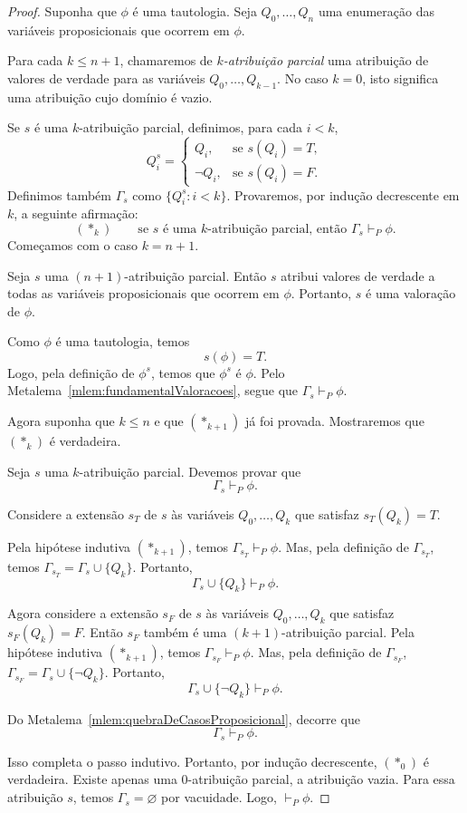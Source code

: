 \begin{proof}
    Suponha que $\phi$ é uma tautologia.
    Seja $Q_0,\dots,Q_n$
    uma enumeração das variáveis proposicionais que ocorrem em $\phi$.

    Para cada $k\leq n+1$, chamaremos de \emph{$k$-atribuição parcial} uma atribuição de valores de verdade para as variáveis $Q_0,\dots,Q_{k-1}$.
    No caso $k=0$, isto significa uma atribuição cujo domínio é vazio.

    Se $s$ é uma $k$-atribuição parcial, definimos, para cada $i<k$,
    \[
        Q_i^s=
        \begin{cases}
            Q_i, & \text{se } s(Q_i)=T,\\
            \neg Q_i, & \text{se } s(Q_i)=F.
        \end{cases}
    \]
    Definimos também $\Gamma_s$ como $\{Q_i^s:i<k\}$.
    Provaremos, por indução decrescente em $k$, a seguinte afirmação:
    \[
        (\ast_k)\qquad
        \text{se }s\text{ é uma }k\text{-atribuição parcial, então }
        \Gamma_s\vdash_P \phi.
    \]
    Começamos com o caso $k=n+1$.

    Seja $s$ uma $(n+1)$-atribuição parcial.
    Então $s$ atribui valores de verdade a todas as variáveis proposicionais que ocorrem em $\phi$.
    Portanto, $s$ é uma valoração de $\phi$.

    Como $\phi$ é uma tautologia, temos
    \[
        s(\phi)=T.
    \]
    Logo, pela definição de $\phi^s$, temos que $\phi^s$ é $\phi$.
    Pelo Metalema~\ref{mlem:fundamentalValoracoes}, segue que $\Gamma_s\vdash_P \phi$.
    
    Agora suponha que $k\leq n$ e que $(\ast_{k+1})$ já foi provada.
    Mostraremos que $(\ast_k)$ é verdadeira.

    Seja $s$ uma $k$-atribuição parcial.
    Devemos provar que
    \[
        \Gamma_s\vdash_P \phi.
    \]

    Considere a extensão $s_T$ de $s$ às variáveis $Q_0,\dots,Q_k$ que satisfaz $s_T(Q_k)=T$.

    Pela hipótese indutiva $(\ast_{k+1})$, temos $\Gamma_{s_T}\vdash_P \phi$.
    Mas, pela definição de $\Gamma_{s_T}$, temos $\Gamma_{s_T}=\Gamma_s\cup\{Q_k\}$.
    Portanto,
    \[
        \Gamma_s\cup\{Q_k\}\vdash_P \phi.
    \]

    Agora considere a extensão $s_F$ de $s$ às variáveis $Q_0,\dots,Q_k$ que satisfaz $s_F(Q_k)=F$.
    Então $s_F$ também é uma $(k+1)$-atribuição parcial.
    Pela hipótese indutiva $(\ast_{k+1})$, temos $\Gamma_{s_F}\vdash_P \phi$.
    Mas, pela definição de $\Gamma_{s_F}$, $\Gamma_{s_F}=\Gamma_s\cup\{\neg Q_k\}$.
    Portanto,
    \[
        \Gamma_s\cup\{\neg Q_k\}\vdash_P \phi.
    \]

    Do Metalema~\ref{mlem:quebraDeCasosProposicional}, decorre que
    \[
        \Gamma_s\vdash_P \phi.
    \]

    Isso completa o passo indutivo.
    Portanto, por indução decrescente, $(\ast_0)$ é verdadeira.
    Existe apenas uma $0$-atribuição parcial, a atribuição vazia.
    Para essa atribuição $s$, temos $\Gamma_s=\varnothing$ por vacuidade.
    Logo, $\vdash_P \phi$.
\end{proof}
